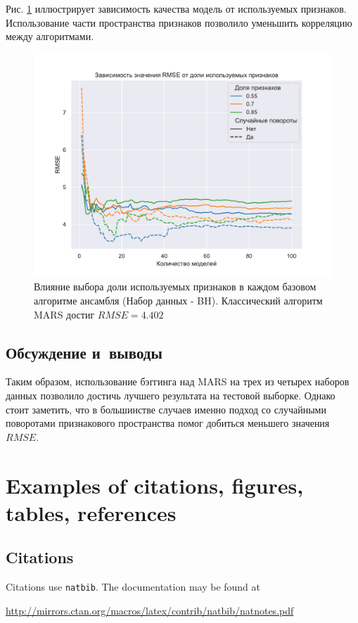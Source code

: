 \documentclass{article}
\begin{document}
Рис. \ref{fig::2} иллюстрирует зависимость качества модель от используемых признаков. Использование части пространства признаков позволило уменьшить корреляцию между алгоритмами.

\begin{figure}[H] %
\begin{center}
    \includegraphics[scale=0.55]{figures/be_subsample.pdf}
    \caption{Влияние выбора доли используемых признаков в каждом базовом алгоритме ансамбля (Набор данных - BH). Классический алгоритм MARS достиг $RMSE = 4.402$}\label{fig::2}
\end{center}
\end{figure}

\subsection{Обсуждение и~выводы}
Таким образом, использование бэггинга над MARS на трех из четырех наборов данных позволило достичь лучшего результата на тестовой выборке. Однако стоит заметить, что в большинстве случаев именно подход со случайными поворотами признакового пространства помог добиться меньшего значения $RMSE$.

\section{Examples of citations, figures, tables, references}
\label{sec:others}

\subsection{Citations}
Citations use \verb+natbib+. The documentation may be found at
\begin{center}
	\url{http://mirrors.ctan.org/macros/latex/contrib/natbib/natnotes.pdf}
\end{center}
\end{document}
